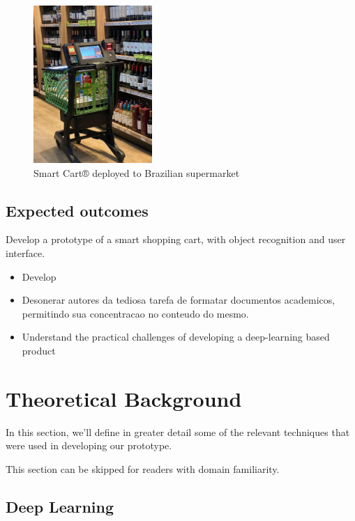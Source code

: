 \documentclass[openright]{normas-utf-tex} %
\begin{document}
\begin{figure}[!htb]
	\centering
	\includegraphics[width=0.4\textwidth]{./images/nextop.jpeg}
	\caption[]{Smart Cart® deployed to Brazilian supermarket}
	\label{fig:dummy}
\end{figure}


\section{Expected outcomes}

Develop a prototype of a smart shopping cart, with object recognition and
user interface.

\begin{itemize}
	\item Develop
	\item Desonerar autores da tediosa tarefa de formatar documentos academicos, permitindo sua concentracao no conteudo do mesmo.
	\item Understand the practical challenges of developing a deep-learning based product
\end{itemize}

\chapter{Theoretical Background}

In this section, we'll define in greater detail some of the relevant techniques
that were used in developing our prototype.

This section can be skipped for readers with domain familiarity.

\section{Deep Learning}
\end{document}
